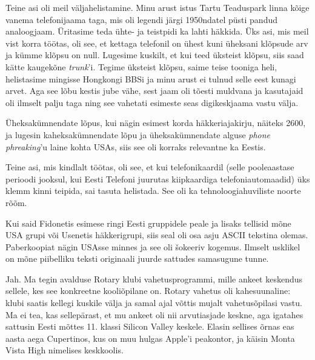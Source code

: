 Teine asi oli meil väljahelistamine. Minu arust istus Tartu 
Teaduspark linna kõige vanema telefonijaama taga, mis 
oli legendi järgi 1950ndatel püsti 
pandud analoogjaam. Üritasime teda ühte- ja teistpidi ka lahti 
häkkida. Üks asi, mis meil vist korra töötas, oli see, et kettaga telefonil on ühest kuni üheksani klõpsude arv 
ja kümme klõpsu on null. Lugesime kuskilt, et kui teed üksteist klõpsu, siis 
saad kätte kaugekõne \emph{trunk}'i. Tegime üksteist klõpsu, saime teise tooniga 
heli, helistasime mingisse Hongkongi BBSi ja minu arust ei tulnud selle 
eest kunagi arvet. Aga see lõbu kestis jube vähe, sest jaam oli tõesti 
muldvana ja kasutajaid oli ilmselt palju taga ning see vahetati esimeste seas 
digikeskjaama vastu välja. 

Üheksakümnendate lõpus, kui nägin esimest korda 
häkkeriajakirju, näiteks 2600, ja lugesin 
kaheksakümnendate lõpu ja üheksakümnendate alguse \emph{phone phreaking}'u laine 
kohta USAs, siis see oli korraks relevantne ka Eestis. 

Teine asi, mis kindlalt töötas, oli see, et kui telefonikaardil (selle 
pooleaastase perioodi jooksul, kui Eesti Telefoni juurutas kiipkaardiga 
telefoniautomaadid) üks klemm 
kinni teipida, sai tasuta helistada. See oli ka tehnoloogiahuviliste 
noorte rõõm.


Kui said Fidonetis esimese ringi Eesti gruppidele peale ja 
lisaks tellisid mõne USA grupi või Usenetis häkkerigrupi, siis 
seal oli osa asju ASCII tekstina olemas. Paberkoopiat nägin 
USAsse minnes ja see oli šokeeriv kogemus. Ilmselt usklikel 
on mõne piibelliku teksti originaali 
juurde sattudes samasugune tunne. 


Jah. Ma tegin avalduse Rotary klubi vahetusprogrammi, mille 
ankeet keskendus sellele, kes see konkreetne kooliõpilane on. Rotary 
vahetus oli kahesuunaline: klubi saatis kellegi kuskile välja ja 
samal ajal võttis mujalt vahetusõpilasi vastu. 
Ma ei tea, kas sellepärast, et mu ankeet oli nii arvutiasjade 
keskne, aga igatahes sattusin Eesti mõttes 11. klassi Silicon Valley keskele. Elasin
sellises õrnas eas aasta aega Cupertinos, kus on muu hulgas 
Apple'i peakontor, ja käisin Monta Vista High nimelises keskkoolis. 

